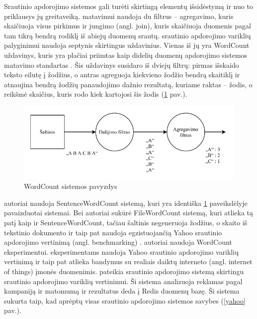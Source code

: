 \documentclass{VUMIFPSbakalaurinis}
\begin{document}
Srautinio apdorojimo sistemos gali turėti skirtingą elementų išsidėstymą ir nuo to priklausys jų greitaveiką. \cite{Karimov2018BenchmarkingDS} matavimui naudoja du filtrus – agregavimo, kuris skaičiuoja visus pirkimus ir jungimo (angl. join), kuris skaičiuoja duomenis pagal tam tikrą bendrą rodiklį iš abiejų duomenų srautų. \cite{Qian2016Benchmarking} srautinio apdorojimo variklių palyginimui naudoja septynis skirtingus uždavinius. Vienas iš jų yra WordCount uždavinys, kuris yra plačiai priimtas kaip didelių duomenų apdorojimo sistemos matavimo standartas \cite{huang2010hibench}. Šis uždavinys susidaro iš dviejų filtrų: pirmas išskaido teksto eilutę į žodžius, o antras agreguoja kiekvieno žodžio bendrą skaitiklį ir atnaujina bendrą žodžių panaudojimo dažnio rezultatą, kuriame raktas – žodis, o reikšmė skaičius, kuris rodo kiek kartojosi šis žodis (\ref{wordcount} pav.). 
\begin{figure}[H]
    \includegraphics[width=15cm]{img/wordcount.pdf}
    \caption{WordCount sistemos pavyzdys}
    \label{wordcount}
\end{figure} 
\cite{zhang2020heron} autoriai naudoja SentenceWordCount sistemą, kuri yra identiška \ref{wordcount} paveikslėlyje pavaizduotai sistemai. Bei autoriai sukūrė FileWordCount sistemą, kuri atlieka tą patį kaip ir SentenceWordCount, tačiau šaltinis negeneruoja žodžius, o skaito iš tekstinio dokumento ir taip pat naudoja egzistuojančią Yahoo srautinio apdorojimo vertinimą (angl. benchmarking) \cite{Chintapalli2016Benchmarking}. \cite{dhalion} autoriai naudoja WordCount eksperimentui. \cite{vaquero2018autotuning} eksperimentams naudoja Yahoo srautinio apdorojimo variklių vertinimą \cite{Chintapalli2016Benchmarking} ir taip pat atlieka bandymus su realiais daiktų interneto (angl. internet of things) įmonės duomenimis. \cite{Chintapalli2016Benchmarking} pateikia srautinio apdorojimo sistemą skirtingu srautinio apdorojimo variklių vertinimui. Ši sistema analizuoja reklamas pagal kampaniją ir matomumą ir rezultatus deda į Redis duomenų bazę. Ši sistema sukurta taip, kad aprėptų visas srautinio apdorojimo sistemos savybes (\ref{yahoo} pav.).
\end{document}
